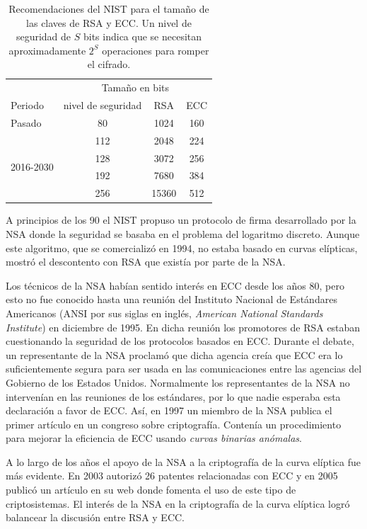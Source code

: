 \documentclass[
  a4paper,
  12pt,
  spanish,
]{scrartcl}
\begin{document}
\begin{table}[h]
  \centering
  \sffamily
  \begin{tabular}{lccc}
    \toprule
     & \multicolumn{3}{c}{Tamaño en bits} \\
    Periodo & nivel de seguridad & RSA & ECC \\
    \midrule
    Pasado & 80 & 1024 & 160\\
    \multirow[t]{4}{*}{2016-2030} & 112 & 2048 & 224\\
     & 128 & 3072 & 256\\
     & 192 & 7680 & 384\\
     & 256 & 15360 & 512\\
    \bottomrule
  \end{tabular}
  \caption{Recomendaciones del NIST para el tamaño de las claves de RSA y ECC. Un nivel de seguridad de \(S\) bits indica que se necesitan aproximadamente \(2^S\) operaciones para romper el cifrado.}
  \label{tab:rsa-ecc-nist}
\end{table}

A principios de los 90 el NIST propuso un protocolo de firma desarrollado por la NSA donde la seguridad se basaba en el problema del logaritmo discreto. Aunque este algoritmo, que se comercializó en 1994, no estaba basado en curvas elípticas, mostró el descontento con RSA que existía por parte de la NSA.

Los técnicos de la NSA habían sentido interés en ECC desde los años 80, pero esto no fue conocido hasta una reunión del Instituto Nacional de Estándares Americanos (ANSI por sus siglas en inglés, \textit{American National Standards Institute}) en diciembre de 1995. En dicha reunión los promotores de RSA estaban cuestionando la seguridad de los protocolos basados en ECC. Durante el debate, un representante de la NSA proclamó que dicha agencia creía que ECC era lo suficientemente segura para ser usada en las comunicaciones entre las agencias del Gobierno de los Estados Unidos. Normalmente los representantes de la NSA no intervenían en las reuniones de los estándares, por lo que nadie esperaba esta declaración a favor de ECC. Así, en 1997 un miembro de la NSA publica el primer artículo en un congreso sobre criptografía. Contenía un procedimiento para mejorar la eficiencia de ECC usando \textit{curvas binarias anómalas}.

A lo largo de los años el apoyo de la NSA a la criptografía de la curva elíptica fue más evidente. En 2003 autorizó 26 patentes relacionadas con ECC y en 2005 publicó un artículo en su web donde fomenta el uso de este tipo de criptosistemas. El interés de la NSA en la criptografía de la curva elíptica logró balancear la discusión entre RSA y ECC.
\end{document}
